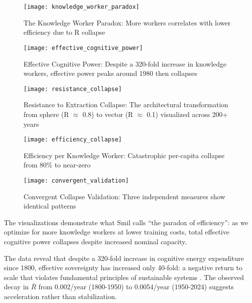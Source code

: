 \begin{figure}[h]
\centering
\texttt{[image: knowledge\_worker\_paradox]}
\caption{The Knowledge Worker Paradox: More workers correlates with lower efficiency due to R collapse}
\label{fig:knowledge_worker_paradox}
\end{figure}

\begin{figure}[h]
\centering
\texttt{[image: effective\_cognitive\_power]}
\caption{Effective Cognitive Power: Despite a 320-fold increase in knowledge workers, effective power peaks around 1980 then collapses}
\label{fig:effective_cognitive_power}
\end{figure}

\begin{figure}[h]
\centering
\texttt{[image: resistance\_collapse]}
\caption{Resistance to Extraction Collapse: The architectural transformation from sphere (R $\approx$ 0.8) to vector (R $\approx$ 0.1) visualized across 200+ years}
\label{fig:resistance_collapse}
\end{figure}

\begin{figure}[h]
\centering
\texttt{[image: efficiency\_collapse]}
\caption{Efficiency per Knowledge Worker: Catastrophic per-capita collapse from 80\% to near-zero}
\label{fig:efficiency_collapse}
\end{figure}

\begin{figure}[h]
\centering
\texttt{[image: convergent\_validation]}
\caption{Convergent Collapse Validation: Three independent measures show identical patterns}
\label{fig:convergent_validation}
\end{figure}

The visualizations demonstrate what Smil calls ``the paradox of efficiency'': as we optimize for more knowledge workers at lower training costs, total effective cognitive power collapses despite increased nominal capacity.

The data reveal that despite a 320-fold increase in cognitive energy expenditure since 1800, effective sovereignty has increased only 40-fold: a negative return to scale that violates fundamental principles of sustainable systems \citep{smil2019}. The observed decay in $\bar{R}$ from 0.002/year (1800-1950) to 0.0054/year (1950-2024) suggests acceleration rather than stabilization.

